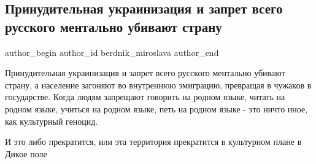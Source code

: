  
 
 
 
 
 
\subsection{Принудительная украинизация и запрет всего русского ментально убивают страну}
\label{sec:29_07_2021.fb.berdnik_miroslava.1.ukrainizacia_foto_sssr}
 
\ifcmt
 author_begin
   author_id berdnik_miroslava
 author_end
\fi

Принудительная украинизация и запрет всего русского ментально убивают страну, а
население загоняют во внутреннюю эмиграцию, превращая в чужаков в государстве.
Когда людям запрещают говорить на родном языке, читать на родном языке, учиться
на родном языке, петь на родном языке - это ничто иное, как культурный геноцид.

И это либо прекратится, или эта территория прекратится в культурном плане в
Дикое поле


